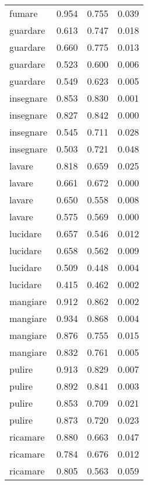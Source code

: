 \begin{longtable}{l|rrr}
fumare         & 0.954  & 0.755     & 0.039         \\
guardare       & 0.613  & 0.747     & 0.018         \\
guardare       & 0.660   & 0.775     & 0.013         \\
guardare       & 0.523  & 0.600       & 0.006         \\
guardare       & 0.549  & 0.623     & 0.005         \\
insegnare      & 0.853  & 0.830      & 0.001         \\
insegnare      & 0.827  & 0.842     & 0.000             \\
insegnare      & 0.545  & 0.711     & 0.028         \\
insegnare      & 0.503  & 0.721     & 0.048         \\
lavare         & 0.818  & 0.659     & 0.025         \\
lavare         & 0.661  & 0.672     & 0.000             \\
lavare         & 0.650   & 0.558     & 0.008         \\
lavare         & 0.575  & 0.569     & 0.000             \\
lucidare       & 0.657  & 0.546     & 0.012         \\
lucidare       & 0.658  & 0.562     & 0.009         \\
lucidare       & 0.509  & 0.448     & 0.004         \\
lucidare       & 0.415  & 0.462     & 0.002         \\
mangiare       & 0.912  & 0.862     & 0.002         \\
mangiare       & 0.934  & 0.868     & 0.004         \\
mangiare       & 0.876  & 0.755     & 0.015         \\
mangiare       & 0.832  & 0.761     & 0.005         \\
pulire         & 0.913  & 0.829     & 0.007         \\
pulire         & 0.892  & 0.841     & 0.003         \\
pulire         & 0.853  & 0.709     & 0.021         \\
pulire         & 0.873  & 0.720      & 0.023         \\
ricamare       & 0.880   & 0.663     & 0.047         \\
ricamare       & 0.784  & 0.676     & 0.012         \\
ricamare       & 0.805  & 0.563     & 0.059         \\

\end{longtable}
